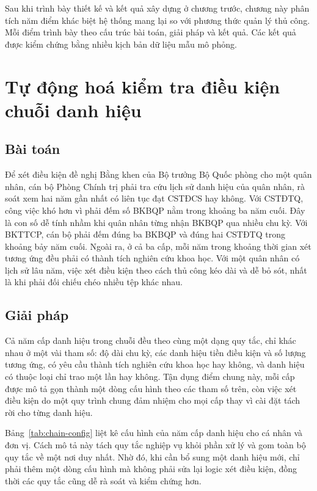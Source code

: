 \documentclass[../DoAn.tex]{subfiles}
\begin{document}
Sau khi trình bày thiết kế và kết quả xây dựng ở chương trước, chương này phân tích năm điểm khác biệt hệ thống mang lại so với phương thức quản lý thủ công.
Mỗi điểm trình bày theo cấu trúc bài toán, giải pháp và kết quả.
Các kết quả được kiểm chứng bằng nhiều kịch bản dữ liệu mẫu mô phỏng.

\section{Tự động hoá kiểm tra điều kiện chuỗi danh hiệu}
\label{section:5.1}

\subsection{Bài toán}
Để xét điều kiện đề nghị Bằng khen của Bộ trưởng Bộ Quốc phòng cho một quân nhân, cán bộ Phòng Chính trị phải tra cứu lịch sử danh hiệu của quân nhân, rà soát xem hai năm gần nhất có liên tục đạt CSTĐCS hay không.
Với CSTĐTQ, công việc khó hơn vì phải đếm số BKBQP nằm trong khoảng ba năm cuối.
Đây là con số dễ tính nhầm khi quân nhân từng nhận BKBQP qua nhiều chu kỳ.
Với BKTTCP, cán bộ phải đếm đúng ba BKBQP và đúng hai CSTĐTQ trong khoảng bảy năm cuối.
Ngoài ra, ở cả ba cấp, mỗi năm trong khoảng thời gian xét tương ứng đều phải có thành tích nghiên cứu khoa học.
Với một quân nhân có lịch sử lâu năm, việc xét điều kiện theo cách thủ công kéo dài và dễ bỏ sót, nhất là khi phải đối chiếu chéo nhiều tệp khác nhau.

\subsection{Giải pháp}
Cả năm cấp danh hiệu trong chuỗi đều theo cùng một dạng quy tắc, chỉ khác nhau ở một vài tham số: độ dài chu kỳ, các danh hiệu tiền điều kiện và số lượng tương ứng, có yêu cầu thành tích nghiên cứu khoa học hay không, và danh hiệu có thuộc loại chỉ trao một lần hay không. Tận dụng điểm chung này, mỗi cấp được mô tả gọn thành một dòng cấu hình theo các tham số trên, còn việc xét điều kiện do một quy trình chung đảm nhiệm cho mọi cấp thay vì cài đặt tách rời cho từng danh hiệu.

Bảng~\ref{tab:chain-config} liệt kê cấu hình của năm cấp danh hiệu cho cá nhân và đơn vị. Cách mô tả này tách quy tắc nghiệp vụ khỏi phần xử lý và gom toàn bộ quy tắc về một nơi duy nhất. Nhờ đó, khi cần bổ sung một danh hiệu mới, chỉ phải thêm một dòng cấu hình mà không phải sửa lại logic xét điều kiện, đồng thời các quy tắc cũng dễ rà soát và kiểm chứng hơn.
\end{document}
